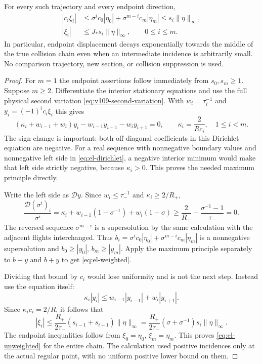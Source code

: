 \begin{theorem}
\label{thm:el-jacobi}
For every such trajectory and every endpoint direction,
\begin{align}
 |c_i\xi_i|&\leq
     \sigma^i c_0|\eta_0|+\sigma^{m-i}c_m|\eta_m|
     \leq s_i\|\eta\|_\infty,\label{eq:el-weighted}\\
 |\xi_i|&\leq J_*s_i\|\eta\|_\infty,
                         \qquad 0\leq i\leq m.\label{eq:el-unweighted}
\end{align}
In particular, endpoint displacement decays exponentially towards the
middle of the true collision chain even when an intermediate incidence
is arbitrarily small. No comparison trajectory, new section, or collision
suppression is used.
\end{theorem}
\begin{proof}
For $m=1$ the endpoint assertions follow immediately from $s_0,s_m\geq1$.
Suppose $m\geq2$. Differentiate the interior stationary equations and
use the full physical second variation \eqref{eq:v109-second-variation}.
With $w_i=\tau_i^{-1}$ and $y_i=(-1)^ic_i\xi_i$ this gives
\begin{equation}\label{eq:el-dirichlet}
 (\kappa_i+w_{i-1}+w_i)y_i-w_{i-1}y_{i-1}-w_iy_{i+1}=0,
 \qquad \kappa_i=\frac2{Rc_i},\quad 1\leq i<m.
\end{equation}
The sign change is important: both off-diagonal coefficients in this
Dirichlet equation are negative. For a real sequence with nonnegative
boundary values and nonnegative left side in \eqref{eq:el-dirichlet},
a negative interior minimum would make that left side strictly negative,
because $\kappa_i>0$. This proves the needed maximum principle directly.

Write the left side as $\mathcal D y$. Since $w_i\leq\tau_-^{-1}$ and
$\kappa_i\geq2/R_+$,
\[
 \frac{\mathcal D(\sigma^i)_i}{\sigma^i}
 =\kappa_i+w_{i-1}(1-\sigma^{-1})+w_i(1-\sigma)
 \geq\frac2{R_+}-\frac{\sigma^{-1}-1}{\tau_-}=0.
\]
The reversed sequence $\sigma^{m-i}$ is a supersolution by the same
calculation with the adjacent flights interchanged. Thus
$b_i=\sigma^ic_0|\eta_0|+\sigma^{m-i}c_m|\eta_m|$ is a nonnegative
supersolution and $b_0\geq|y_0|$, $b_m\geq|y_m|$.
Apply the maximum principle separately to $b-y$ and $b+y$ to get
\eqref{eq:el-weighted}.

Dividing that bound by $c_i$ would lose uniformity and is not the next
step. Instead use the equation itself:
\[
 \kappa_i|y_i|
 \leq w_{i-1}|y_{i-1}|+w_i|y_{i+1}|.
\]
Since $\kappa_ic_i=2/R$, it follows that
\[
 |\xi_i|\leq\frac{R_+}{2\tau_-}(s_{i-1}+s_{i+1})\|\eta\|_\infty
 =\frac{R_+}{2\tau_-}(\sigma+\sigma^{-1})s_i\|\eta\|_\infty.
\]
The endpoint inequalities follow from $\xi_0=\eta_0$, $\xi_m=\eta_m$.
This proves \eqref{eq:el-unweighted} for the entire chain. The calculation
used positive incidences only at the actual regular point, with no
uniform positive lower bound on them.
\end{proof}

